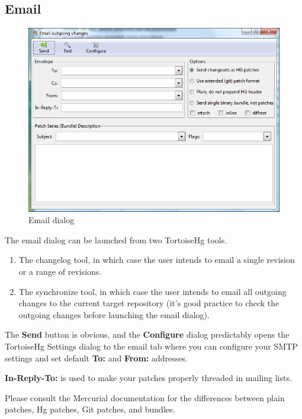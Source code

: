 \documentclass[letterpaper,10pt,english]{manual}
\begin{document}
\subsection{Email}
\begin{figure}[htbp]
\centering

\includegraphics{email.png}
\caption{Email dialog}\end{figure}

The email dialog can be launched from two TortoiseHg tools.
\begin{enumerate}
\item {} 
The changelog tool, in which case the user intends to email a single
revision or a range of revisions.

\item {} 
The synchronize tool, in which case the user intends to email all
outgoing changes to the current target repository (it's good practice to
check the outgoing changes before launching the email dialog).

\end{enumerate}

The \textbf{Send} button is obvious, and the \textbf{Configure}
dialog predictably opens the TortoiseHg Settings dialog to the email tab
where you can configure your SMTP settings and set default
\textbf{To:} and \textbf{From:} addresses.

\textbf{In-Reply-To:} is used to make your patches properly threaded
in mailing lists.

Please consult the Mercurial documentation for the differences between
plain patches, Hg patches, Git patches, and bundles.
\end{document}
